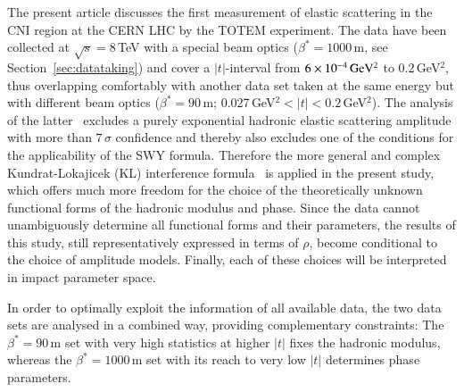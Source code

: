 The present article discusses the first measurement of elastic scattering in the
CNI region at the CERN LHC by the TOTEM experiment. 
The data have been collected at $\sqrt{s} = 8\,$TeV with a special beam optics 
($\beta^{*}=1000\,$m, see Section~\ref{sec:datataking}) and cover a $|t|$-interval
from $6\times10^{-4}\,\rm GeV^{2}$ to 0.2\,GeV$^{2}$, thus overlapping comfortably
with another data set taken at the same energy but with different beam optics
($\beta^{*}=90\,$m; 0.027\,GeV$^{2} < |t| < 0.2\,$GeV$^{2}$). The analysis of the
latter~\cite{8tev-90m} excludes a purely exponential hadronic elastic scattering
amplitude with more than $7\,\sigma$ confidence and thereby also excludes
one of the conditions for the applicability of the SWY formula.
Therefore the more general and complex Kundrat-Lokajicek (KL) interference 
formula~\cite{kl94} is applied in the present study, which offers much more freedom for the
choice of the theoretically unknown functional forms of the hadronic modulus 
and phase. Since the data cannot unambiguously determine all functional forms and their parameters, the results of this study, still representatively 
expressed in terms of $\rho$, become conditional to the choice of amplitude models. Finally, each of these choices will be interpreted in impact parameter space.

In order to optimally exploit the information of all available data, the two 
data sets are analysed in a combined way, providing complementary constraints:
The $\beta^{*}=90\,$m set with very high statistics at higher $|t|$ fixes the 
hadronic modulus, whereas the $\beta^{*}=1000\,$m set with its reach to very low
$|t|$ determines phase parameters.




%
%
